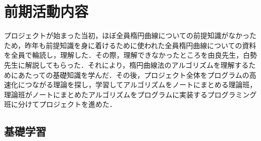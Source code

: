 \documentclass[openany,11pt,papersize]{jsbook}
\begin{document}
\chapter{前期活動内容}

プロジェクトが始まった当初，ほぼ全員楕円曲線についての前提知識がなかったため，昨年も前提知識を身に着けるために使われた全員楕円曲線についての資料を全員で輪読し，理解した．その際，理解できなかったところを由良先生，白勢先生に解説してもらった．それにより，楕円曲線法のアルゴリズムを理解するためにあたっての基礎知識を学んだ．その後，プロジェクト全体をプログラムの高速化につながる理論を探し，学習してアルゴリズムをノートにまとめる理論班，理論班がノートにまとめたアルゴリズムをプログラムに実装するプログラミング班に分けてプロジェクトを進めた．


\section{基礎学習}
\end{document}

